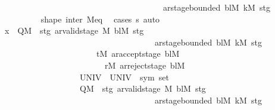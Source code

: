 \begin{isabellebody}
\ \ \ \ \ \ \ \ \ \ \ \ \ \ \ \ \ \ \ \ \ \ \ \ \ \ \ \ \ \ \ \ \ \ \ \ \ \ {\isasymand}\ ar{\isacharunderscore}{\kern0pt}stage{\isacharunderscore}{\kern0pt}bounded\ bl\isactrlsub M\ k\isactrlsub M\ stg{\isacharbraceright}{\kern0pt}{\isachardoublequoteclose}\isanewline
\ \ \ \ \ \ \ \ \isamarkupfalse%
\ shape\ inter\ M{\isacharunderscore}{\kern0pt}eq\ \isamarkupfalse%
\ {\isacharparenleft}{\kern0pt}cases\ s{\isacharprime}{\kern0pt}{\isacharparenright}{\kern0pt}\ auto\isanewline
\ \ \ \ \ \ \isamarkupfalse%
\ {\isachardoublequoteopen}x\ {\isasymin}\ {\isacharparenleft}{\kern0pt}{\isacharparenleft}{\kern0pt}Q\isactrlsub M\ {\isasymtimes}\ {\isacharbraceleft}{\kern0pt}stg{\isachardot}{\kern0pt}\ ar{\isacharunderscore}{\kern0pt}valid{\isacharunderscore}{\kern0pt}stage\ {\isasymGamma}\isactrlsub M\ bl\isactrlsub M\ stg\isanewline
\ \ \ \ \ \ \ \ \ \ \ \ \ \ \ \ \ \ \ \ \ \ \ \ \ \ \ \ \ \ \ \ \ \ \ \ {\isasymand}\ ar{\isacharunderscore}{\kern0pt}stage{\isacharunderscore}{\kern0pt}bounded\ bl\isactrlsub M\ k\isactrlsub M\ stg{\isacharbraceright}{\kern0pt}{\isacharparenright}{\kern0pt}\isanewline
\ \ \ \ \ \ \ \ \ \ \ \ \ \ \ \ \ \ \ \ \ \ {\isacharminus}{\kern0pt}\ {\isacharbraceleft}{\kern0pt}{\isacharparenleft}{\kern0pt}t\isactrlsub M{\isacharcomma}{\kern0pt}\ ar{\isacharunderscore}{\kern0pt}accept{\isacharunderscore}{\kern0pt}stage\ bl\isactrlsub M{\isacharparenright}{\kern0pt}{\isacharcomma}{\kern0pt}\isanewline
\ \ \ \ \ \ \ \ \ \ \ \ \ \ \ \ \ \ \ \ \ \ \ \ \ {\isacharparenleft}{\kern0pt}r\isactrlsub M{\isacharcomma}{\kern0pt}\ ar{\isacharunderscore}{\kern0pt}reject{\isacharunderscore}{\kern0pt}stage\ bl\isactrlsub M{\isacharparenright}{\kern0pt}{\isacharbraceright}{\kern0pt}{\isacharparenright}{\kern0pt}\isanewline
\ \ \ \ \ \ \ \ \ \ \ \ \ \ \ \ \ \ {\isasymtimes}\ {\isacharparenleft}{\kern0pt}UNIV\ {\isasymrightarrow}\ {\isacharparenleft}{\kern0pt}UNIV\ {\isacharcolon}{\kern0pt}{\isacharcolon}{\kern0pt}\ sym{}\ set{\isacharparenright}{\kern0pt}{\isacharparenright}{\kern0pt}\isanewline
\ \ \ \ \ \ \ \ \ \ \ \ \ \ \ \ \ \ {\isasymtimes}\ {\isacharparenleft}{\kern0pt}Q\isactrlsub M\ {\isasymtimes}\ {\isacharbraceleft}{\kern0pt}stg{\isachardot}{\kern0pt}\ ar{\isacharunderscore}{\kern0pt}valid{\isacharunderscore}{\kern0pt}stage\ {\isasymGamma}\isactrlsub M\ bl\isactrlsub M\ stg\isanewline
\ \ \ \ \ \ \ \ \ \ \ \ \ \ \ \ \ \ \ \ \ \ \ \ \ \ \ \ \ \ \ \ \ \ \ \ {\isasymand}\ ar{\isacharunderscore}{\kern0pt}stage{\isacharunderscore}{\kern0pt}bounded\ bl\isactrlsub M\ k\isactrlsub M\ stg{\isacharbraceright}{\kern0pt}{\isacharparenright}{\kern0pt}\isanewline

\end{isabellebody}
